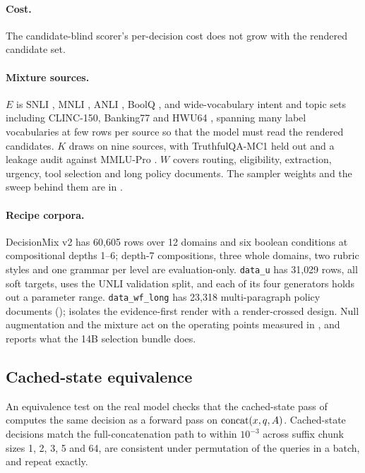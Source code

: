 \paragraph{Cost.} The candidate-blind scorer's per-decision cost does not grow with the rendered candidate
set.

\paragraph{Mixture sources.} $E$ is SNLI \citep{bowman2015snli}, MNLI \citep{williams2018mnli}, ANLI
\citep{nie2020anli}, BoolQ \citep{clark2019boolq}, and wide-vocabulary intent and topic sets including
CLINC-150, Banking77 and HWU64 \citep{larson2019clinc,casanueva2020banking77}, spanning many label
vocabularies at few rows per source so that the model must read the rendered candidates. $K$ draws on nine
sources, with TruthfulQA-MC1 \citep{lin2022truthfulqa} held out and a leakage audit against MMLU-Pro
\citep{wang2024mmlupro,hendrycks2021mmlu}. $W$ covers routing, eligibility, extraction, urgency, tool
selection and long policy documents. The sampler weights and the sweep behind them are in
.

\paragraph{Recipe corpora.} DecisionMix v2 has 60{,}605 rows over 12 domains and six boolean conditions at
compositional depths 1--6; depth-7 compositions, three whole domains, two rubric styles and one grammar
per level are evaluation-only. \texttt{data\_u} has 31{,}029 rows, all soft targets, uses the UNLI
validation split, and each of its four generators holds out a parameter range. \texttt{data\_wf\_long}
has 23{,}318 multi-paragraph policy documents (); 
isolates the evidence-first render with a render-crossed design. Null augmentation and the mixture act on
the operating points measured in , and
 reports what the 14B selection bundle does.

\subsection{Cached-state equivalence}
\label{app:cache-equivalence}

An equivalence test on the real model checks that the cached-state pass of  computes
the same decision as a forward pass on $\mathrm{concat}(x, q, A)$. Cached-state decisions
match the full-concatenation path to within $10^{-3}$ across suffix chunk sizes 1, 2, 3, 5 and 64, are
consistent under permutation of the queries in a batch, and repeat exactly.

